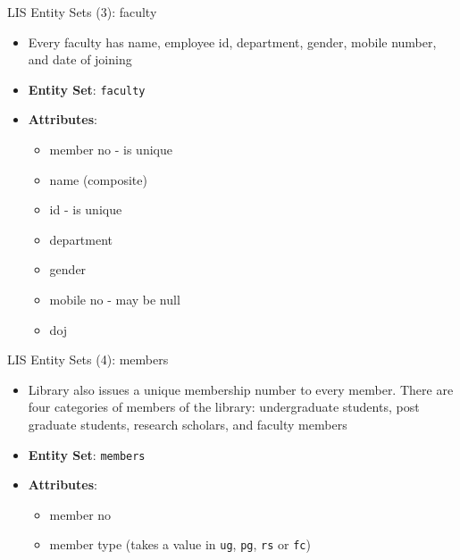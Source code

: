 \documentclass[aspectratio=169, xcolor=dvipsnames]{beamer}
\begin{document}
\begin{frame}{LIS Entity Sets (3): faculty}
    \begin{itemize}
        \item Every faculty has name, employee id, department, gender, mobile number, and date of joining
        \item \textbf{Entity Set}: \texttt{faculty}
        \item \textbf{Attributes}:
        \begin{itemize}
            \item member no - is unique
            \item name (composite)
            \item id - is unique
            \item department
            \item gender
            \item mobile no - may be null
            \item doj
        \end{itemize}
    \end{itemize}
\end{frame}

\begin{frame}{LIS Entity Sets (4): members}
    \begin{itemize}
        \item Library also issues a unique membership number to every member. There are four categories of members of the library: undergraduate students, post graduate students, research scholars, and faculty members
        \item \textbf{Entity Set}: \texttt{members}
        \item \textbf{Attributes}:
        \begin{itemize}
            \item member no
            \item member type (takes a value in \texttt{ug}, \texttt{pg}, \texttt{rs} or \texttt{fc})
        \end{itemize}
    \end{itemize}
\end{frame}
\end{document}
